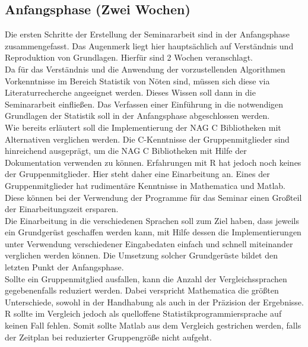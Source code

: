 \documentclass{article}
\begin{document}
\subsection{Anfangsphase (Zwei Wochen)}
Die ersten Schritte der Erstellung der Seminararbeit sind in der Anfangsphase zusammengefasst.
Das Augenmerk liegt hier hauptsächlich auf Verständnis und Reproduktion von Grundlagen.
Hierfür sind 2 Wochen veranschlagt.
\\
Da für das Verständnis und die Anwendung der vorzustellenden Algorithmen Vorkenntnisse im Bereich Statistik von Nöten sind, müssen sich diese via Literaturrecherche angeeignet werden.
Dieses Wissen soll dann in die Seminararbeit einfließen.
Das Verfassen einer Einführung in die notwendigen Grundlagen der Statistik soll in der Anfangsphase abgeschlossen werden.
\\
Wie bereits erläutert soll die Implementierung der NAG C Bibliotheken mit Alternativen verglichen werden.
Die C-Kenntnisse der Gruppenmitglieder sind hinreichend ausgeprägt, um die NAG C Bibliotheken mit Hilfe der Dokumentation verwenden zu können.
Erfahrungen mit R hat jedoch noch keines der Gruppenmitglieder.
Hier steht daher eine Einarbeitung an.
Eines der Gruppenmitglieder hat rudimentäre Kenntnisse in Mathematica und Matlab.
Diese können bei der Verwendung der Programme für das Seminar einen Großteil der Einarbeitungszeit ersparen.
\\
Die Einarbeitung in die verschiedenen Sprachen soll zum Ziel haben, dass jeweils ein Grundgerüst geschaffen werden kann, mit Hilfe dessen die Implementierungen unter Verwendung verschiedener Eingabedaten einfach und schnell miteinander verglichen werden können.
Die Umsetzung solcher Grundgerüste bildet den letzten Punkt der Anfangsphase.
\\
Sollte ein Gruppenmitglied ausfallen, kann die Anzahl der Vergleichssprachen gegebenenfalls reduziert werden.
Dabei verspricht Mathematica die größten Unterschiede, sowohl in der Handhabung als auch in der Präzision der Ergebnisse.
R sollte im Vergleich jedoch als quelloffene Statistikprogrammiersprache auf keinen Fall fehlen.
Somit sollte Matlab aus dem Vergleich gestrichen werden, falls der Zeitplan bei reduzierter Gruppengröße nicht aufgeht.
\end{document}
